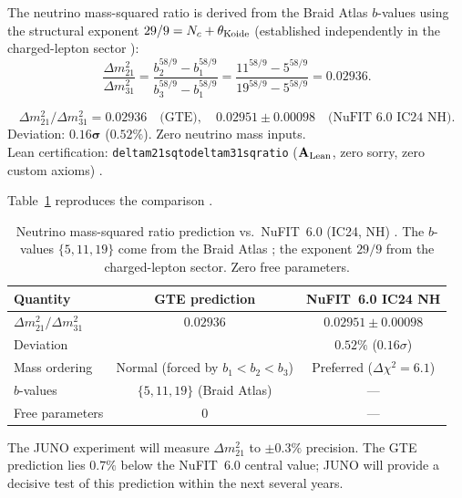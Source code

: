 \documentclass[11pt,openany]{book}
\theoremstyle{remark}
\newcommand{\lean}[1]{%
  \penalty-100
  \begingroup\def\_{\textunderscore\allowbreak}\texttt{#1}\endgroup}
\newcommand{\Nc}{N_c}
\newcommand{\CatAL}{\ensuremath{\textbf{A}_{\rm Lean}}}
\begin{document}
The neutrino mass-squared ratio is derived from the Braid Atlas $b$-values using the
structural exponent $29/9 = \Nc + \theta_{\rm Koide}$ (established independently in
the charged-lepton sector \cite{Spivack2026_Koide}):
\begin{equation}
  \frac{\Delta m^2_{21}}{\Delta m^2_{31}}
  = \frac{b_2^{58/9} - b_1^{58/9}}{b_3^{58/9} - b_1^{58/9}}
  = \frac{11^{58/9} - 5^{58/9}}{19^{58/9} - 5^{58/9}}
  = 0.02936.
  \label{eq:mnu_ratio}
\end{equation}

\begin{tcolorbox}[colback=orange!5,colframe=orange!60,title={Headline Result: Neutrino Mass-Squared Ratio (\CatAL)}]
\[
  \Delta m^2_{21}/\Delta m^2_{31} = 0.02936\quad \text{(GTE)},
  \quad 0.02951\pm0.00098\quad \text{(NuFIT~6.0 IC24 NH)}.
\]
Deviation: $\mathbf{0.16\sigma}$ ($0.52\%$).  Zero neutrino mass inputs.\\[2pt]
Lean certification: \lean{delta\_m21\_sq\_to\_delta\_m31\_sq\_ratio} (\CatAL,
zero sorry, zero custom axioms) \cite{SpivackNeutrino}.
\end{tcolorbox}

Table~\ref{tab:nu_ratio} reproduces the comparison \cite{SpivackNeutrino}.

\begin{table}[htbp]
\centering
\caption{Neutrino mass-squared ratio prediction vs.\ NuFIT~6.0 (IC24, NH)
\cite{NuFIT60}.  The $b$-values $\{5,11,19\}$ come from the Braid Atlas
\cite{SpivackBraidAtlas}; the exponent $29/9$ from the charged-lepton sector.
Zero free parameters.}
\label{tab:nu_ratio}
\renewcommand{\arraystretch}{1.15}
\begin{tabular}{lcc}
\toprule
\textbf{Quantity} & \textbf{GTE prediction} & \textbf{NuFIT~6.0 IC24 NH} \\
\midrule
$\Delta m^2_{21}/\Delta m^2_{31}$ & $0.02936$ & $0.02951\pm0.00098$ \\
Deviation & & $0.52\%$ ($0.16\sigma$) \\
Mass ordering & Normal (forced by $b_1<b_2<b_3$) & Preferred ($\Delta\chi^2=6.1$) \\
$b$-values & $\{5,11,19\}$ (Braid Atlas) & --- \\
Free parameters & 0 & --- \\
\bottomrule
\end{tabular}
\end{table}

The JUNO experiment will measure $\Delta m^2_{21}$ to $\pm 0.3\%$ precision.
The GTE prediction lies $0.7\%$ below the NuFIT~6.0 central value; JUNO will
provide a decisive test of this prediction within the next several years.
\end{document}
